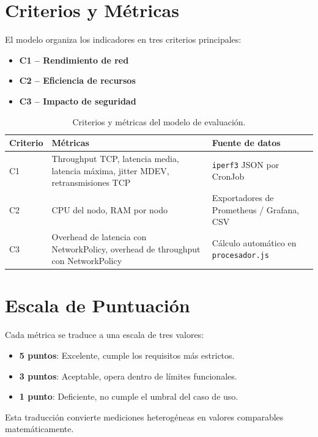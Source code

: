 \documentclass[12pt,a4paper]{article}
\begin{document}
\section{Criterios y Métricas}

El modelo organiza los indicadores en tres criterios principales:

\begin{itemize}
  \item \textbf{C1 -- Rendimiento de red}
  \item \textbf{C2 -- Eficiencia de recursos}
  \item \textbf{C3 -- Impacto de seguridad}
\end{itemize}

\begin{table}[htbp]
\centering
\caption{Criterios y métricas del modelo de evaluación.
}\label{tab:criterios-metricas}
\begin{tabular}{p{2.3cm}p{5.5cm}p{6cm}}
\toprule
\textbf{Criterio} & \textbf{Métricas} & \textbf{Fuente de datos} \\
\midrule
C1 & Throughput TCP, latencia media, latencia máxima, jitter MDEV, retransmisiones TCP & \texttt{iperf3} JSON por CronJob \\
C2 & CPU del nodo, RAM por nodo & Exportadores de Prometheus / Grafana, CSV \\
C3 & Overhead de latencia con NetworkPolicy, overhead de throughput con NetworkPolicy & Cálculo automático en \texttt{procesador.js} \\
\bottomrule
\end{tabular}
\end{table}

\section{Escala de Puntuación}

Cada métrica se traduce a una escala de tres valores:

\begin{itemize}
  \item \textbf{5 puntos}: Excelente, cumple los requisitos más estrictos.
  \item \textbf{3 puntos}: Aceptable, opera dentro de límites funcionales.
  \item \textbf{1 punto}: Deficiente, no cumple el umbral del caso de uso.
\end{itemize}

Esta traducción convierte mediciones heterogéneas en valores comparables matemáticamente.
\end{document}
